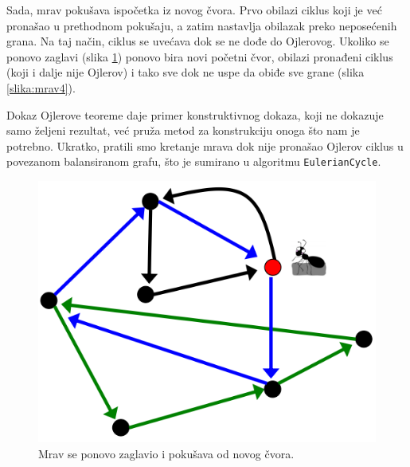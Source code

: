 Sada, mrav pokušava ispočetka iz novog čvora. Prvo obilazi ciklus koji je već pronašao u prethodnom pokušaju, a zatim nastavlja obilazak preko neposećenih grana. Na taj način, ciklus se uvećava dok se ne dođe do Ojlerovog. Ukoliko se ponovo zaglavi (slika \ref{slika:mrav3}) ponovo bira novi početni čvor, obilazi pronađeni ciklus (koji i dalje nije Ojlerov) i tako sve dok ne uspe da obiđe sve grane (slika \ref{slika:mrav4}).

\newpage
Dokaz Ojlerove teoreme daje primer konstruktivnog dokaza, koji ne dokazuje samo željeni rezultat, već pruža metod za konstrukciju onoga što nam je potrebno. Ukratko, pratili smo kretanje mrava dok nije pronašao Ojlerov ciklus u povezanom balansiranom grafu, što je sumirano u algoritmu \texttt{EulerianCycle}.

\noindent
\begin{minipage}{\textwidth}
	\centering
	\begin{minipage}{0.45\textwidth}
		\begin{figure}[H]
			\centering
			\includegraphics[width=\textwidth]{poglavlja/3/slike/mrav3.png}
			\caption{Mrav se ponovo zaglavio i pokušava od novog čvora.}
			\label{slika:mrav3}
		\end{figure} 
	\end{minipage}
	\hfill 
	\begin{minipage}{0.45\textwidth}
		\begin{figure}[H]
			\centering

\end{figure}
\end{minipage}
\end{minipage}
